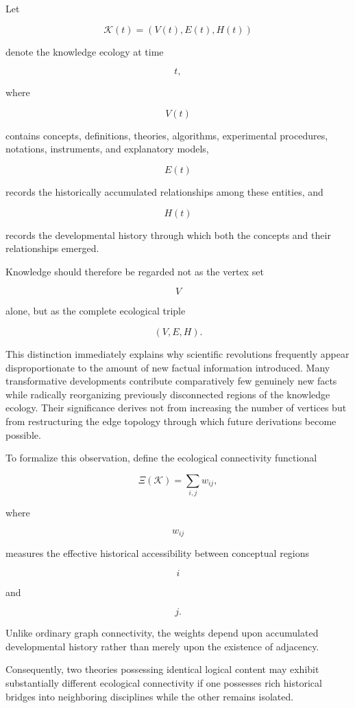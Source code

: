 \documentclass[12pt,oneside]{article}
\theoremstyle{remark}
\begin{document}
Let

\[
\mathcal K(t)
=
(V(t),E(t),H(t))
\]

denote the knowledge ecology at time

\[
t,
\]

where

\[
V(t)
\]

contains concepts, definitions, theories, algorithms, experimental procedures,
notations, instruments, and explanatory models,

\[
E(t)
\]

records the historically accumulated relationships among these entities, and

\[
H(t)
\]

records the developmental history through which both the concepts and their
relationships emerged.

Knowledge should therefore be regarded not as the vertex set

\[
V
\]

alone, but as the complete ecological triple

\[
(V,E,H).
\]

This distinction immediately explains why scientific revolutions frequently
appear disproportionate to the amount of new factual information introduced.
Many transformative developments contribute comparatively few genuinely new
facts while radically reorganizing previously disconnected regions of the
knowledge ecology. Their significance derives not from increasing the number of
vertices but from restructuring the edge topology through which future
derivations become possible.

To formalize this observation, define the ecological connectivity functional

\[
\Xi(\mathcal K)
=
\sum_{i,j}
w_{ij},
\]

where

\[
w_{ij}
\]

measures the effective historical accessibility between conceptual regions

\[
i
\]

and

\[
j.
\]

Unlike ordinary graph connectivity, the weights depend upon accumulated
developmental history rather than merely upon the existence of adjacency.

Consequently, two theories possessing identical logical content may exhibit
substantially different ecological connectivity if one possesses rich
historical bridges into neighboring disciplines while the other remains
isolated.
\end{document}
